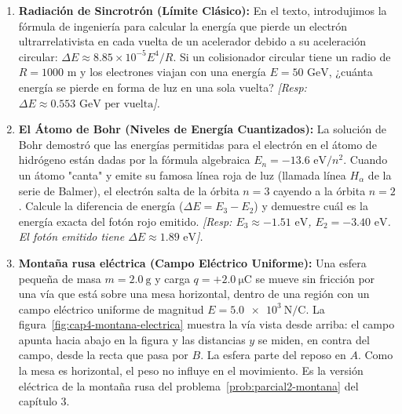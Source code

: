 \documentclass[11pt,a4paper]{book}
\begin{document}
\begin{enumerate}
    \item \textbf{Radiación de Sincrotrón (Límite Clásico):} En el texto, introdujimos la fórmula de ingeniería para calcular la energía que pierde un electrón ultrarrelativista en cada vuelta de un acelerador debido a su aceleración circular: $\Delta E \approx 8.85 \times 10^{-5} E^4 / R$. Si un colisionador circular tiene un radio de $R = 1000 \text{ m}$ y los electrones viajan con una energía $E = 50 \text{ GeV}$, ¿cuánta energía se pierde en forma de luz en una sola vuelta?
    \textit{[Resp: $\Delta E \approx 0.553 \text{ GeV per vuelta}$].}

    \item \textbf{El Átomo de Bohr (Niveles de Energía Cuantizados):} La solución de Bohr demostró que las energías permitidas para el electrón en el átomo de hidrógeno están dadas por la fórmula algebraica $E_n = -13.6 \text{ eV} / n^2$. 
    Cuando un átomo "canta" y emite su famosa línea roja de luz (llamada línea $H_\alpha$ de la serie de Balmer), el electrón salta de la órbita $n=3$ cayendo a la órbita $n=2$. Calcule la diferencia de energía ($\Delta E = E_3 - E_2$) y demuestre cuál es la energía exacta del fotón rojo emitido.
    \textit{[Resp: $E_3 \approx -1.51 \text{ eV}$, $E_2 = -3.40 \text{ eV}$. El fotón emitido tiene $\Delta E \approx 1.89 \text{ eV}$].}

    \item\label{prob:cap4-montana-electrica} \textbf{Montaña rusa eléctrica (Campo Eléctrico Uniforme):}
    Una esfera pequeña de masa $m = \SI{2.0}{\gram}$ y carga $q = +\SI{2.0}{\micro\coulomb}$ se mueve sin fricción por una vía que está sobre una mesa horizontal, dentro de una región con un campo eléctrico uniforme de magnitud $E = \SI{5.0e3}{\newton\per\coulomb}$. La figura~\ref{fig:cap4-montana-electrica} muestra la vía vista desde arriba: el campo apunta hacia abajo en la figura y las distancias $y$ se miden, en contra del campo, desde la recta que pasa por $B$. La esfera parte del reposo en $A$. Como la mesa es horizontal, el peso no influye en el movimiento. Es la versión eléctrica de la montaña rusa del problema~\ref{prob:parcial2-montana} del capítulo 3.


\end{enumerate}
\end{document}
